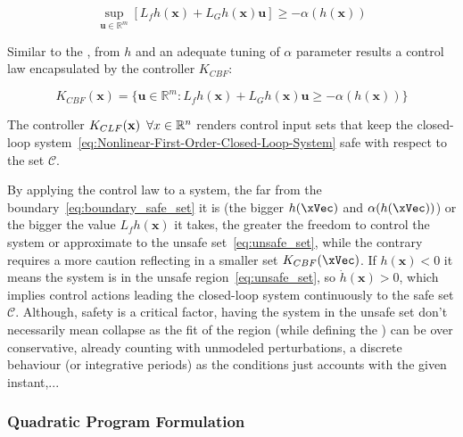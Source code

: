 \begin{equation}
 \sup_{\mathbf{u} \in \mathbb{R}^m} [L_fh(\mathbf{x}) + L_Gh(\mathbf{x})\mathbf{u}] \geq -\alpha(h( \mathbf{x} ))
 \label{eq:CBF}
\end{equation}

Similar to the , from  \(h\) and an adequate tuning of \( \alpha \) parameter results a control law encapsulated by the controller \(K_{CBF}\):

\begin{equation}
 K_{CBF}(\mathbf{x}) = \{ \mathbf{u} \in \mathbb{R}^m: L_fh(\mathbf{x}) + L_Gh(\mathbf{x})\mathbf{u} \geq -\alpha(h( \mathbf{x} )) \}
 \label{eq:K-CBF}
\end{equation}


The controller \(K_{CLF}(\mathbf{x}) \hspace{0.5em} \forall x \in \mathbb{R}^n \) renders control input sets that keep the closed-loop system~\eqref{eq:Nonlinear-First-Order-Closed-Loop-System} safe with respect to the set \(\mathcal{C}\). \par

By applying the control law to a system, the far from the boundary~\eqref{eq:boundary_safe_set} it is (the bigger \(h(\xVec)\) and \(\alpha(h(\xVec))\)) or the bigger the value \(L_fh( \mathbf{x} )\) it takes, the greater the freedom to control the system or approximate to the unsafe set~\eqref{eq:unsafe_set}, while the contrary requires a more caution reflecting in a smaller set \(K_{CBF}(\xVec)\). If \(h( \mathbf{x} ) < 0\) it means the system is in the unsafe region~\eqref{eq:unsafe_set}, so \(\dot{h}( \mathbf{x}) > 0\), which implies control actions leading the closed-loop system continuously to the safe set \(\mathcal{C}\). Although, safety is a critical factor, having the system in the unsafe set don't necessarily mean collapse as the fit of the region (while defining the ) can be over conservative, already counting with unmodeled perturbations, a discrete behaviour (or integrative periods) as the  conditions just accounts with the given instant,... \\ 





\subsubsection{Quadratic Program Formulation}
\label{subsub:quadratic_program_formulation}

